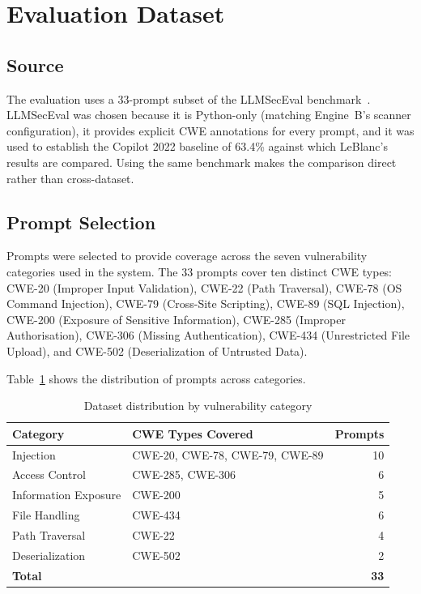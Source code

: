 \documentclass[12pt,a4paper]{report}
\begin{document}
\section{Evaluation Dataset}
\label{sec:dataset}

\subsection{Source}
\label{ssec:datasource}

The evaluation uses a 33-prompt subset of the LLMSecEval
benchmark~\cite{tony2023llmseceval}. LLMSecEval was chosen because it is
Python-only (matching Engine~B's scanner configuration), it provides explicit
CWE annotations for every prompt, and it was used to establish the Copilot 2022
baseline of 63.4\% against which LeBlanc's results are compared. Using the same
benchmark makes the comparison direct rather than cross-dataset.

\subsection{Prompt Selection}
\label{ssec:promptselect}

Prompts were selected to provide coverage across the seven vulnerability
categories used in the system. The 33 prompts cover ten distinct CWE types:
CWE-20 (Improper Input Validation), CWE-22 (Path Traversal), CWE-78 (OS Command
Injection), CWE-79 (Cross-Site Scripting), CWE-89 (SQL Injection), CWE-200
(Exposure of Sensitive Information), CWE-285 (Improper Authorisation), CWE-306
(Missing Authentication), CWE-434 (Unrestricted File Upload), and CWE-502
(Deserialization of Untrusted Data).

Table~\ref{tab:dataset} shows the distribution of prompts across categories.

\begin{table}[H]
\centering
\caption{Dataset distribution by vulnerability category}
\label{tab:dataset}
\renewcommand{\arraystretch}{1.3}
\begin{tabular}{@{}llr@{}}
\toprule
\textbf{Category}        & \textbf{CWE Types Covered}           & \textbf{Prompts} \\
\midrule
Injection                & CWE-20, CWE-78, CWE-79, CWE-89      & 10 \\
Access Control           & CWE-285, CWE-306                     & 6  \\
Information Exposure     & CWE-200                              & 5  \\
File Handling            & CWE-434                              & 6  \\
Path Traversal           & CWE-22                               & 4  \\
Deserialization          & CWE-502                              & 2  \\
\midrule
\textbf{Total}           &                                      & \textbf{33} \\
\bottomrule
\end{tabular}
\end{table}
\end{document}

